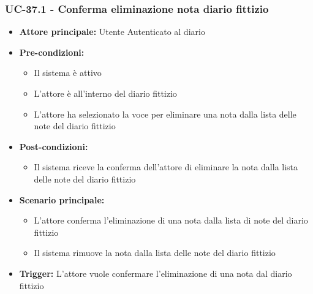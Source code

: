 \documentclass[a4paper,12pt]{article}
\begin{document}
\subsubsection{UC-37.1 - Conferma eliminazione nota diario fittizio}\label{subsec:UC-37.1}
\begin{itemize}
    \item \textbf{Attore principale:} Utente Autenticato al diario
    \item \textbf{Pre-condizioni:}
    \begin{itemize}
        \item Il sistema è attivo
        \item L'attore è all'interno del diario fittizio
        \item L'attore ha selezionato la voce per eliminare una nota dalla lista delle note del diario fittizio
    \end{itemize}
    \item \textbf{Post-condizioni:} 
    \begin{itemize}
        \item Il sistema riceve la conferma dell'attore di eliminare la nota dalla lista delle note del diario fittizio
    \end{itemize}
    \item \textbf{Scenario principale:} 
    \begin{itemize}
        \item L'attore conferma l'eliminazione di una nota dalla lista di note del diario fittizio
        \item Il sistema rimuove la nota dalla lista delle note del diario fittizio
    \end{itemize}
    \item \textbf{Trigger:} L'attore vuole confermare l'eliminazione di una nota dal diario fittizio
\end{itemize}
\end{document}
